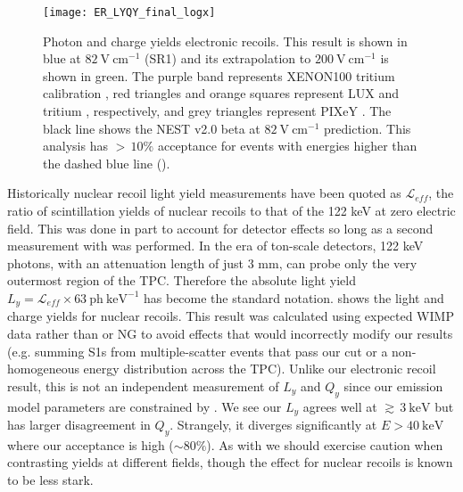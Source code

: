 \begin{figure}
\centering
\texttt{[image: ER\_LYQY\_final\_logx]}
\caption{Photon and charge yields electronic recoils.  This result is shown in blue at $82\ \mathrm{V\ cm^{-1}}$ (SR1) and its
extrapolation to $200\ \mathrm{V\ cm^{-1}}$ is shown in green.  The purple band represents XENON100 tritium calibration
, red triangles and orange squares represent
LUX   and tritium , respectively, and grey triangles represent PIXeY 
.  The black line shows the NEST v2.0 beta at $82\ \mathrm{V\ cm^{-1}}$ prediction.  This analysis has ${>}\, 10\%$
acceptance for events with energies higher than the dashed blue line ().}
\label{fig:er_nr_calibrations_results_ly_qy_er}
\end{figure}

Historically nuclear recoil light yield measurements have been quoted as
$\mathcal{L}_{eff}$, the ratio of scintillation yields of nuclear recoils to that of the  122 keV \gammaray at zero
electric field.  This was done in part to account for detector effects so long as a second measurement with  was
performed.  In the era of ton-scale detectors, 122 keV photons, with an attenuation length of just 3 mm, can probe only the very
outermost region of the TPC.  Therefore the absolute light yield $L_y = \mathcal{L}_{eff} \times 63\ \mathrm{ph\ keV^{-1}}$ has
become the standard notation.   shows the light and charge yields for nuclear
recoils.  This result was calculated using expected WIMP data rather than \ambe or NG to avoid effects that would incorrectly modify
our results (e.g. summing S1s from multiple-scatter events that pass our cut or a non-homogeneous energy distribution across the
TPC).  Unlike our electronic recoil result, this is not an independent measurement of $L_y$ and $Q_y$ since our emission model parameters
are constrained by .  We
see our $L_y$ agrees well at ${\gtrsim}\, 3\ \mathrm{keV}$ but has larger disagreement in $Q_y$.  Strangely, it diverges significantly at
$E > 40\ \mathrm{keV}$ where our acceptance is high (${\sim} 80\%$).  As with  we should
exercise caution when contrasting yields at different fields, though the effect for nuclear recoils is known to be less stark.

